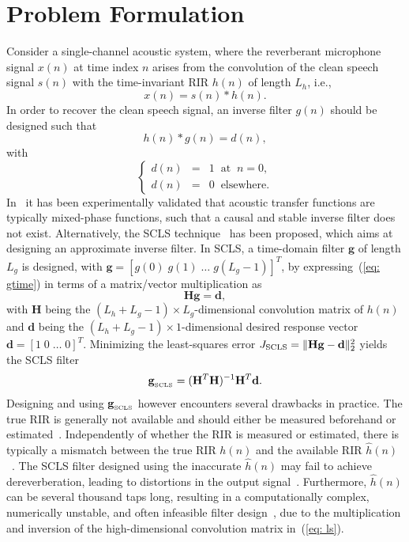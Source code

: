 \documentclass{article}
\begin{document}
\section{Problem Formulation}
\label{sec: prob}
Consider a single-channel acoustic system, where the reverberant microphone signal $x(n)$ at time index $n$ arises from the convolution of the clean speech signal $s(n)$ with the time-invariant RIR $h(n)$ of length $L_h$, i.e., 
\begin{equation}
\label{eq: conv}
x(n) = s(n)\ast h(n).
\end{equation}
In order to recover the clean speech signal, an inverse filter $g(n)$ should be designed such that
\begin{equation}
\label{eq: gtime}
h(n) \ast g(n) = d(n),
\end{equation}
with
\begin{equation}
  \left\{
  \begin{array}{lcl}
    d(n) & = & 1 \; \; {\text{at}} \; \; n = 0,\\
    d(n) & = & 0 \; \; {\text{elsewhere}}.
  \end{array}
  \right.
\end{equation}
In~\cite{Neely_1979} it has been experimentally validated that acoustic transfer functions are typically mixed-phase functions, such that a causal and stable inverse filter does not exist.
Alternatively, the SCLS technique~\cite{Mourjopoulos_1982} has been proposed, which aims at designing an approximate inverse filter.
In SCLS, a time-domain filter $\mathbf{g}$ of length $L_g$ is designed, with $\mathbf{g} = [g(0) \; g(1) \; \ldots \; g(L_g-1)]^T$, by expressing~(\ref{eq: gtime}) in terms of a matrix/vector multiplication as 
\begin{equation}
\mathbf{H}\mathbf{g} = \mathbf{d},
\end{equation}
with $\mathbf{H}$ being the $(L_h + L_g -1) \times L_g$-dimensional convolution matrix of $h(n)$ and $\mathbf{d}$ being the $(L_h+L_g-1) \times 1$-dimensional desired response vector $\mathbf{d}  = [1 \; 0 \; \ldots \; 0]^T$.
Minimizing the least-squares error $J_{\rm SCLS} = \|\mathbf{H}\mathbf{g} - \mathbf{d} \|_2^2$ yields the SCLS filter 
\begin{equation}
\label{eq: ls}
\mathbf{g}_{\rm _{SCLS}} = (\mathbf{H}^T\mathbf{H})^{-1}\mathbf{H}^T\mathbf{d}.
\end{equation}
Designing and using $\mathbf{g}_{\rm _{SCLS}}$ however encounters several drawbacks in practice. 
The true RIR is generally not available and should either be measured beforehand or estimated~\cite{Huang_ITSP_2003}.
Independently of whether the RIR is measured or estimated, there is typically a mismatch between the true RIR $h(n)$ and the available RIR $\hat{h}(n)$~\cite{Hikichi_EURASIP_2007,Radlovic_ITSA_2000,Hasan_EUSIPCO_2006}.
The SCLS filter designed using the inaccurate $\hat{h}(n)$ may fail to achieve dereverberation, leading to distortions in the output signal~\cite{Naylor_IWAENC_2005}.
Furthermore, $\hat{h}(n)$ can be several thousand taps long, resulting in a computationally complex, numerically unstable, and often infeasible filter design~\cite{Naylor_IWAENC_2005}, due to the multiplication and inversion of the high-dimensional convolution matrix in~(\ref{eq: ls}). 
\end{document}
